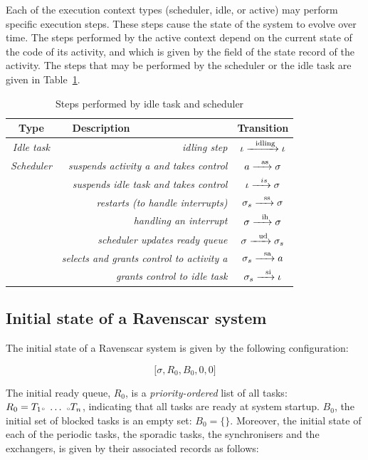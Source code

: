 Each of the execution context types (scheduler, idle, or active) may
perform specific execution steps. These steps cause the state of the
system to evolve over time. The steps performed by the active context
depend on the current state of the code of its activity, and which is
given by the  field of the state record of the activity. The
steps that may be performed by the scheduler or the idle task are
given in Table~\ref{legal_idle_sched}.

\begin{table}
\caption{Steps performed by idle task and scheduler}
\label{legal_idle_sched}
\centering
\begin{tabular}{|c|r|c|}
\hline
\textbf{Type} & \textbf{Description\ \ \ \ \ \ \ \ \ \ \ \ \ \ \ \ \ } & \textbf{Transition}\\
\hline
\emph{Idle task} & \emph{idling step} & $\iota \xrightarrow{\ \ \text{idling}}
\iota$\\
\hline
\emph{Scheduler} & \emph{suspends activity a and takes control} & $a
\xrightarrow{\ \ \text{as}} \sigma$\\
 & \emph{suspends idle task and takes control} &
$\iota\xrightarrow{\ \ is}\sigma$\\ 
 & \emph{restarts (to handle
  interrupts)} & $\sigma_s\xrightarrow{\ \ \text{ss}}\sigma$\\ 
 & \emph{handling an interrupt} & $\sigma\xrightarrow{\ \ \text{ih}}\sigma$\\
 & \emph{scheduler updates ready queue} &
$\sigma\xrightarrow{\ \ \text{ud}}\sigma_s$\\ 
 & \emph{selects and grants control to activity a} &
$\sigma_s\xrightarrow{\ \ \text{sa}}a$\\ 
 & \emph{grants control to idle task} &
$\sigma_s\xrightarrow{\ \ \text{si}}\iota$\\
\hline
\end{tabular}
\end{table}

\subsection{Initial state of a Ravenscar system}

The initial state of a Ravenscar system is given by the following configuration:

\begin{equation}
  \big[ \sigma, R_0, B_0, 0, 0 \big]
\end{equation}

The initial ready queue, $R_0$, is a \emph{priority-ordered} list of
all tasks: $ R_0 = T_1 {\scriptscriptstyle \circ} \ \ldots \ {\scriptscriptstyle \circ} T_n$, indicating
that all tasks are ready at system startup. $B_0$, the initial set of
blocked tasks is an empty set: $B_0=\{\}$. Moreover, the initial state
of each of the periodic tasks, the sporadic tasks, the synchronisers
and the exchangers, is given by their associated records as follows:\\

